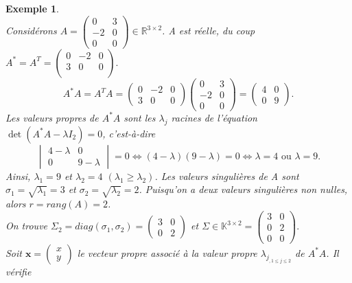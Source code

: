 \documentclass[11pt,a4paper,oneside]{book}
\newtheorem{ex}{Exemple}[chapter]}
\def\R{\mathbb R}
\def\K{\mathbb K}
\def\x{\mathbf x}
\def\y{\mathbf y}
\begin{document}
\begin{ex}
\emph{\\}
Considérons $ A=\begin{pmatrix}
0&3\\-2&0\\0&0
\end{pmatrix}\in\R^{3\times 2} $. A est réelle, du coup $ A^{*}=A^{T}=\begin{pmatrix}
0&-2&0\\
3&0&0\\
\end{pmatrix}.$
$$A^{*}A=A^{T}A=\begin{pmatrix}
0&-2&0\\ 3&0&0
\end{pmatrix}\begin{pmatrix}
0&3\\-2&0\\0&0
\end{pmatrix}=\begin{pmatrix}
4&0\\ 0&9
\end{pmatrix}. $$
Les valeurs propres de $ A^{*}A $ sont les $ \lambda_{j} $ racines de l'équation $ \det(A^{*}A-\lambda I_{2})=0 $, c'est-à-dire
\begin{equation*}
\begin{vmatrix}
4-\lambda&0\\
0&9-\lambda
\end{vmatrix}=0\Leftrightarrow (4-\lambda)(9-\lambda)=0\Leftrightarrow \lambda=4\text{ ou } \lambda=9.
\end{equation*}
Ainsi, $ \lambda_{1}=9 $ et $ \lambda_{2}=4 $ $ (\lambda_{1}\geq \lambda_{2}) $. Les valeurs singulières de A sont $ \sigma_{1}=\sqrt{\lambda_{1}}=3 $ et $ \sigma_{2}=\sqrt{\lambda_{2}}=2 $. Puisqu'on a deux valeurs singulières non nulles, alors $r= rang(A) =2$.\\
 On trouve $ \Sigma_{2}=diag(\sigma_{1},\sigma_{2})=\begin{pmatrix}
3&0\\0&2
\end{pmatrix} $ et $ \Sigma\in\K^{3\times 2}=\begin{pmatrix}
3&0\\0&2\\0&0
\end{pmatrix}. $ \\
Soit $ \x=\begin{pmatrix}
x\\y
\end{pmatrix} $ le vecteur propre associé à la valeur propre $ \lambda_{j_{,1\leq j\leq 2}} $ de $ A^{*}A $. Il vérifie

\end{ex}
\end{document}
